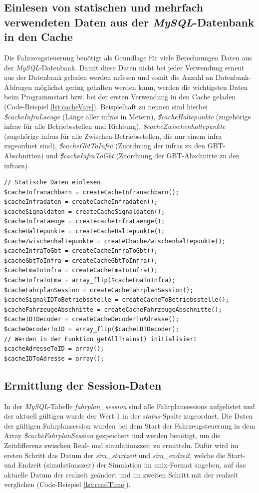 \subsection{Einlesen von statischen und mehrfach verwendeten Daten aus der \textit{MySQL}-Datenbank in den Cache} \label{main_1}
Die Fahrzeugsteuerung benötigt als Grundlage für viele Berechnungen Daten aus der \textit{MySQL}-Daten\-bank. Damit diese Daten nicht bei jeder Verwendung erneut aus der Datenbank geladen werden müssen und somit die Anzahl an Datenbank-Abfragen möglichst gering gehalten werden kann, werden die wichtigsten Daten beim Programmstart bzw. bei der ersten Verwendung in den Cache geladen (Code-Beispiel \ref{lst:cacheVars}). Beispielhaft zu nennen sind hierbei \textit{\$cache\-Infra\-Laenge} (Länge aller \acp{infra} in Metern), \textit{\$cache\-Haltepunkte} (zugehörige \ac{infra}e für alle Betriebsstellen und Richtung), \textit{\$cacheZwischenhaltepunkte} (zugehörige \acp{infra} für alle Zwischen-Betriebsstellen, die nur einem \ac{infra} zugeordnet sind), \textit{\$cache\-Gbt\-To\-Infra} (Zuordnung der \acp{infra} zu den GBT-Abschnitten) und \textit{\$cache\-Infra\-To\-Gbt} (Zuordnung der GBT-Abschnitte zu  den \acp{infra}n).
\begin{lstlisting}[caption={Initialisierung der Cache Variablen \textit{(fahrzeug\-steu\-e\-rung.php)}},captionpos=b,label={lst:cacheVars}]
// Statische Daten einlesen
$cacheInfranachbarn = createCacheInfranachbarn();
$cacheInfradaten = createCacheInfradaten();
$cacheSignaldaten = createCacheSignaldaten();
$cacheInfraLaenge = createcacheInfraLaenge();
$cacheHaltepunkte = createCacheHaltepunkte();
$cacheZwischenhaltepunkte = createChacheZwischenhaltepunkte();
$cacheInfraToGbt = createCacheInfraToGbt();
$cacheGbtToInfra = createCacheGbtToInfra();
$cacheFmaToInfra = createCacheFmaToInfra();
$cacheInfraToFma = array_flip($cacheFmaToInfra);
$cacheFahrplanSession = createCacheFahrplanSession();
$cacheSignalIDToBetriebsstelle = createCacheToBetriebsstelle();
$cacheFahrzeugeAbschnitte = createCacheFahrzeugeAbschnitte();
$cacheIDTDecoder = createCacheDecoderToAdresse();
$cacheDecoderToID = array_flip($cacheIDTDecoder);
// Werden in der Funktion getAllTrains() initialisiert
$cacheAdresseToID = array();
$cacheIDToAdresse = array();
\end{lstlisting}
\subsection{Ermittlung der Session-Daten} \label{main_12}
In der \textit{MySQL}-Tabelle \textit{fahrplan\_session} sind alle Fahrplansessions aufgelistet und der aktuell gültigen wurde der Wert 1 in der \textit{status}-Spalte zugeordnet. Die Daten der gültigen Fahrplansession wurden bei dem Start der Fahrzeugsteuerung in dem Array \textit{\$cacheFahrplanSession} gespeichert und werden benötigt, um die Zeitdifferenz zwischen Real- und \Gls{simulationszeit} zu ermitteln. Dafür wird im ersten Schritt das Datum der \textit{sim\_startzeit} und \textit{sim\_endzeit}, welche die Start- und Endzeit (\Gls{simulationszeit}) der Simulation im \Gls{unix}-Format angeben, auf das aktuelle Datum der \Gls{realzeit} geändert und im zweiten Schritt mit der \Gls{realzeit} verglichen (Code-Beispiel \ref{lst:readTime}).

